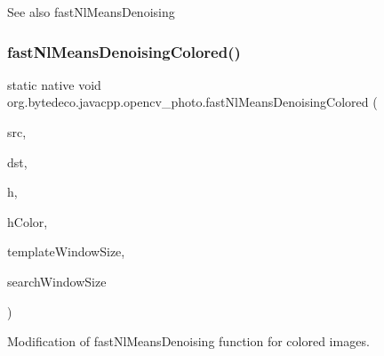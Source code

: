\begin{DoxySeeAlso}{See also}
fast\+Nl\+Means\+Denoising 
\end{DoxySeeAlso}
\mbox{\label{group__photo__denoise_ga0e990dae474182098fcd723642e78888}} 
\subsubsection{\texorpdfstring{fast\+Nl\+Means\+Denoising\+Colored()}{fastNlMeansDenoisingColored()}\hspace{0.1cm}{\footnotesize\ttfamily [1/2]}}
{\footnotesize\ttfamily static native void org.\+bytedeco.\+javacpp.\+opencv\+\_\+photo.\+fast\+Nl\+Means\+Denoising\+Colored (\begin{DoxyParamCaption}\item[{@By\+Val Mat}]{src,  }\item[{@By\+Val Mat}]{dst,  }\item[{float}]{h,  }\item[{float}]{h\+Color,  }\item[{int}]{template\+Window\+Size,  }\item[{int}]{search\+Window\+Size }\end{DoxyParamCaption})\hspace{0.3cm}{\ttfamily [static]}}



Modification of fast\+Nl\+Means\+Denoising function for colored images. 



